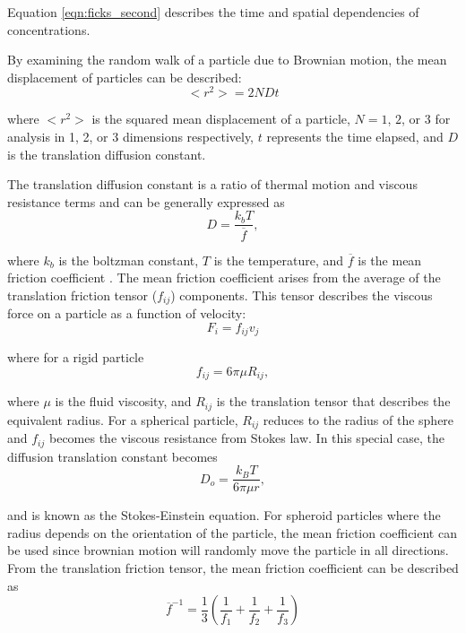 \noindent Equation \ref{eqn:ficks_second} describes the time and spatial dependencies of concentrations.

\par By examining the random walk of a particle due to Brownian motion, the mean displacement of particles can be described:
\begin{equation}
    \Big< r^2 \Big> = 2 N D t
\end{equation}

\noindent where $<r^2>$ is the squared mean displacement of a particle, $N = 1$, $2$, or $3$ for analysis in 1, 2, or 3 dimensions respectively, $t$ represents the time elapsed, and $D$ is the translation diffusion constant. 

\par The translation diffusion constant is a ratio of thermal motion and viscous resistance terms and can be generally expressed as 
\begin{equation}
    D = \frac{k_bT}{\overline{f}},
\end{equation}

\noindent where $k_b$ is the boltzman constant, $T$ is the temperature, and $\overline{f}$ is the mean friction coefficient \cite{probstein_physicochemical_2005}. The mean friction coefficient arises from the average of the translation friction tensor ($f_{ij}$) components. This tensor describes the viscous force on a particle as a function of velocity:
\begin{equation}
    F_i = f_{ij}v_j
\end{equation}

\noindent where for a rigid particle
\begin{equation}
    f_{ij} = 6\pi \mu R_{ij},
\end{equation}

\noindent where $\mu$ is the fluid viscosity, and $R_{ij}$ is the translation tensor that describes the equivalent radius. For a spherical particle, $R_{ij}$ reduces to the radius of the sphere and $f_{ij}$ becomes the viscous resistance from Stokes law. In this special case, the diffusion translation constant becomes
\begin{equation}
    D_o = \frac{k_BT}{6 \pi \mu r},
\end{equation}

and is known as the Stokes-Einstein equation. For spheroid particles where the radius depends on the orientation of the particle, the mean friction coefficient can be used since brownian motion will randomly move the particle in all directions. From the translation friction tensor, the mean friction coefficient can be described as 
\begin{equation}
    \overline{f}^{-1} = \frac{1}{3}(\frac{1}{f_1} + \frac{1}{f_2} + \frac{1}{f_3})
\end{equation}

